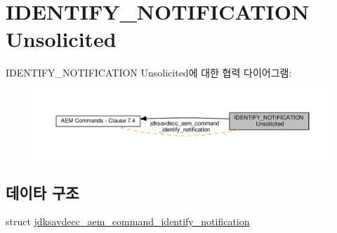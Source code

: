 \hypertarget{group__command__identify__notification}{}\section{I\+D\+E\+N\+T\+I\+F\+Y\+\_\+\+N\+O\+T\+I\+F\+I\+C\+A\+T\+I\+ON Unsolicited}
\label{group__command__identify__notification}
I\+D\+E\+N\+T\+I\+F\+Y\+\_\+\+N\+O\+T\+I\+F\+I\+C\+A\+T\+I\+ON Unsolicited에 대한 협력 다이어그램\+:
\nopagebreak
\begin{figure}[H]
\begin{center}
\leavevmode
\includegraphics[width=350pt]{group__command__identify__notification}
\end{center}
\end{figure}
\subsection*{데이타 구조}
\begin{DoxyCompactItemize}
\item 
struct \hyperlink{structjdksavdecc__aem__command__identify__notification}{jdksavdecc\+\_\+aem\+\_\+command\+\_\+identify\+\_\+notification}
\end{DoxyCompactItemize}
